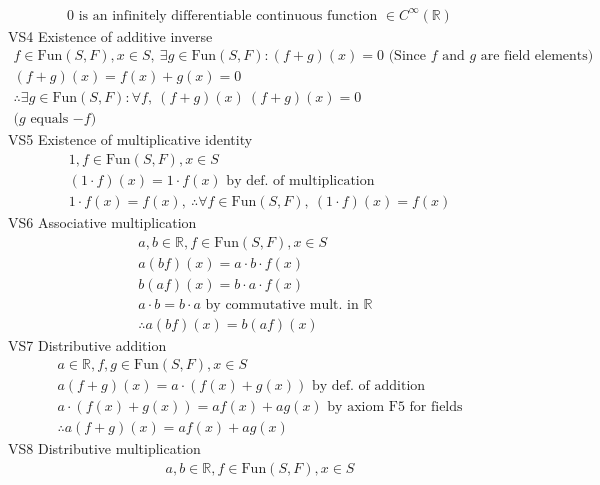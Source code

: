 \documentclass{article}
\begin{document}
\begin{enumerate}
\begin{enumerate}
\begin{gather*}
            0 \textrm{ is an infinitely differentiable continuous function } \in C^{\infty}(\mathbb{R})
        \end{gather*}
        VS4 Existence of additive inverse
        \begin{gather*}
            f \in \textrm{Fun}(S,F), x \in S, \ \exists g \in \textrm{Fun}(S,F) : (f+g)(x) = 0 \textrm{ (Since $f$ and $g$ are field elements)}\\
            (f + g)(x) = f(x) + g(x) = 0 \\
            \therefore \exists g \in \textrm{Fun}(S,F) : \forall f, \ (f+g)(x) \ (f+g)(x) = 0 \\
            \textrm{($g$ equals $-f$)}
        \end{gather*}
        VS5 Existence of multiplicative identity
        \begin{gather*}
            1,f \in \textrm{Fun}(S,F), x \in S \\
            (1 \cdot f)(x) = 1\cdot f(x) \textrm{ by def. of multiplication} \\
            1 \cdot f(x) = f(x), \ \therefore \forall f \in \textrm{Fun}(S,F), \ (1 \cdot f)(x) = f(x)
        \end{gather*}
        VS6 Associative multiplication
        \begin{gather*}
            a,b \in \mathbb{R}, f \in \textrm{Fun}(S,F), x \in S \\
            a(bf)(x) = a \cdot b \cdot f(x) \\
            b(af)(x) = b \cdot a \cdot f(x) \\
            a \cdot b = b \cdot a \textrm{ by commutative mult. in $\mathbb{R}$ } \\
            \therefore a(bf)(x) = b(af)(x)
        \end{gather*}
        VS7 Distributive addition
        \begin{gather*}
            a \in \mathbb{R}, f,g \in \textrm{Fun}(S,F), x \in S \\
            a(f + g)(x) = a \cdot (f(x) + g(x)) \textrm{ by def. of addition} \\
            a \cdot (f(x) + g(x)) = af(x) + ag(x) \textrm{ by axiom F5 for fields} \\
            \therefore a(f + g)(x) = af(x) + ag(x)
        \end{gather*}
        VS8 Distributive multiplication
        \begin{gather*}
            a,b \in \mathbb{R}, f \in \textrm{Fun}(S,F), x \in S \\

\end{gather*}
\end{enumerate}
\end{enumerate}
\end{document}
